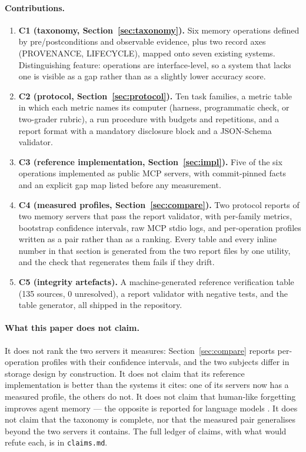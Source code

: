 \documentclass[11pt,a4paper]{article}
\begin{document}
\paragraph{Contributions.}
\begin{enumerate}[leftmargin=1.4em]
\item \textbf{C1 (taxonomy, Section~\ref{sec:taxonomy}).} Six memory operations defined by
pre/postconditions and observable evidence, plus two record axes (PROVENANCE, LIFECYCLE),
mapped onto seven existing systems. Distinguishing feature: operations are interface-level, so
a system that lacks one is visible as a gap rather than as a slightly lower accuracy score.
\item \textbf{C2 (protocol, Section~\ref{sec:protocol}).} Ten task families, a metric table in
which each metric names its computer (harness, programmatic check, or two-grader rubric), a run
procedure with budgets and repetitions, and a report format with a mandatory disclosure block
and a JSON-Schema validator.
\item \textbf{C3 (reference implementation, Section~\ref{sec:impl}).} Five of the six
operations implemented as public MCP servers, with commit-pinned facts and an explicit gap map
listed before any measurement.
\item \textbf{C4 (measured profiles, Section~\ref{sec:compare}).} Two protocol reports of two
memory servers that pass the report validator, with per-family metrics, bootstrap confidence
intervals, raw MCP stdio logs, and per-operation profiles written as a pair rather than as a
ranking. Every table and every inline number in that section is generated from the two report
files by one utility, and the check that regenerates them fails if they drift.
\item \textbf{C5 (integrity artefacts).} A machine-generated reference verification table
(135 sources, 0 unresolved), a report validator with negative tests, and the table generator,
all shipped in the repository.
\end{enumerate}

\paragraph{What this paper does not claim.}
It does not rank the two servers it measures: Section~\ref{sec:compare} reports per-operation
profiles with their confidence intervals, and the two subjects differ in storage design by
construction. It does not claim that its reference implementation is better than the systems it
cites: one of its servers now has a measured profile, the others do not. It does not claim that
human-like forgetting improves agent memory --- the opposite is reported for language models
\cite{wang2026simulating}. It does not claim that the taxonomy is complete, nor that the
measured pair generalises beyond the two servers it contains. The full ledger of claims, with
what would refute each, is in \texttt{claims.md}.
\end{document}
